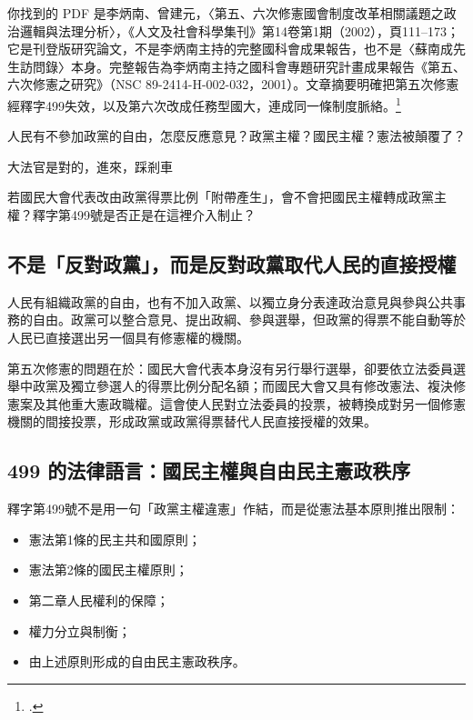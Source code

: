 你找到的 PDF 是李炳南、曾建元，〈第五、六次修憲國會制度改革相關議題之政治邏輯與法理分析〉，《人文及社會科學集刊》第14卷第1期（2002），頁111--173；它是刊登版研究論文，不是李炳南主持的完整國科會成果報告，也不是〈蘇南成先生訪問錄〉本身。完整報告為李炳南主持之國科會專題研究計畫成果報告《第五、六次修憲之研究》（NSC 89-2414-H-002-032，2001）。文章摘要明確把第五次修憲經釋字499失效，以及第六次改成任務型國大，連成同一條制度脈絡。\footcites{lee2002}{pres325}{pres93}{jy499}


\begin{qaprompt}
人民有不參加政黨的自由，怎麼反應意見？政黨主權？國民主權？憲法被顛覆了？

大法官是對的，進來，踩剎車
\end{qaprompt}

\begin{qaquestion}
若國民大會代表改由政黨得票比例「附帶產生」，會不會把國民主權轉成政黨主權？釋字第499號是否正是在這裡介入制止？
\end{qaquestion}

\subsection{不是「反對政黨」，而是反對政黨取代人民的直接授權}

人民有組織政黨的自由，也有不加入政黨、以獨立身分表達政治意見與參與公共事務的自由。政黨可以整合意見、提出政綱、參與選舉，但政黨的得票不能自動等於人民已直接選出另一個具有修憲權的機關。

第五次修憲的問題在於：國民大會代表本身沒有另行舉行選舉，卻要依立法委員選舉中政黨及獨立參選人的得票比例分配名額；而國民大會又具有修改憲法、複決修憲案及其他重大憲政職權。這會使人民對立法委員的投票，被轉換成對另一個修憲機關的間接投票，形成政黨或政黨得票替代人民直接授權的效果。

\subsection{499 的法律語言：國民主權與自由民主憲政秩序}

釋字第499號不是用一句「政黨主權違憲」作結，而是從憲法基本原則推出限制：

\begin{itemize}
\tightlist
\item
  憲法第1條的民主共和國原則；
\item
  憲法第2條的國民主權原則；
\item
  第二章人民權利的保障；
\item
  權力分立與制衡；
\item
  由上述原則形成的自由民主憲政秩序。
\end{itemize}

